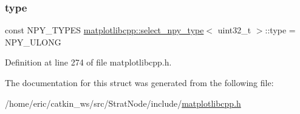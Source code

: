 \subsubsection{\texorpdfstring{type}{type}}
{\footnotesize\ttfamily const N\+P\+Y\+\_\+\+T\+Y\+P\+ES \mbox{\hyperlink{structmatplotlibcpp_1_1select__npy__type}{matplotlibcpp\+::select\+\_\+npy\+\_\+type}}$<$ uint32\+\_\+t $>$\+::type = N\+P\+Y\+\_\+\+U\+L\+O\+NG\hspace{0.3cm}{\ttfamily [static]}}



Definition at line 274 of file matplotlibcpp.\+h.



The documentation for this struct was generated from the following file\+:\begin{DoxyCompactItemize}
\item 
/home/eric/catkin\+\_\+ws/src/\+Strat\+Node/include/\mbox{\hyperlink{matplotlibcpp_8h}{matplotlibcpp.\+h}}\end{DoxyCompactItemize}
